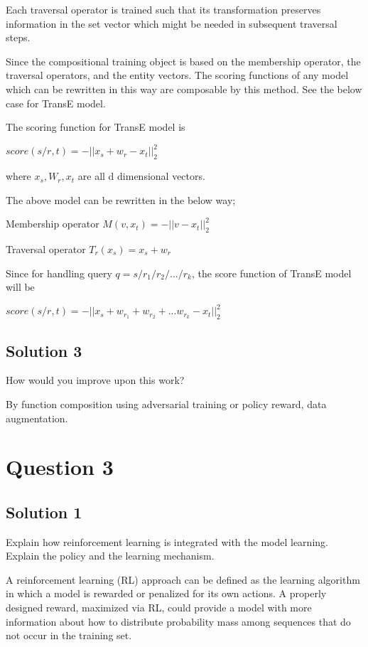 \documentclass[12pt,leqno,a4paper]{article}
\begin{document}
Each traversal operator is trained such that its transformation preserves information in the set vector which might be needed in subsequent
traversal steps.

Since the compositional training object is based on  the membership operator, the traversal operators, and the entity vectors. The scoring functions of any model which can be rewritten in this way are composable by this method. See the below case for TransE model.

\vspace{5pt}


The scoring function for TransE model is 

$score(s/r,t) = -||x_{s}+w_{r}-x_t||_{2}^{2} $ 

where $x_{s},W_{r},x_t$ are all d dimensional vectors. 

The above model can be rewritten in the below way;

Membership operator $M(v,x_t) = -||v -x_t||_{2}^{2}$ 

Traversal operator $T_{r}(x_s)= x_s+w_r$ 

Since for handling query $q=s/r_1/r_2/.../r_k$, the score function of TransE model will be 

$score(s/r,t) = -||x_{s}+w_{r_1}+w_{r_2}+...w_{r_k}-x_t||_{2}^{2} $ 

\subsection{Solution 3}
How would you improve upon this work?
\newline

By function composition using adversarial training or policy reward, data augmentation.

\section{Question 3}

\subsection{Solution 1}
Explain how reinforcement learning is integrated with the model learning.
Explain the policy and the learning mechanism.
\newline


A reinforcement learning (RL) approach can be defined as the learning algorithm in which a model is rewarded or penalized for its own actions. A properly designed reward, maximized via RL, could provide a model with more information about how to distribute probability mass among sequences that do not occur in the training set. 
\end{document}
